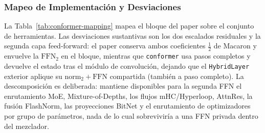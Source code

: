 \subsubsection{Mapeo de Implementación y Desviaciones}

La Tabla~\ref{tab:conformer-mapping} mapea el bloque del paper sobre el conjunto de herramientas. Las desviaciones sustantivas son los dos escalados residuales y la segunda capa feed-forward: el paper conserva ambos coeficientes $\tfrac12$ de Macaron y envuelve la $\mathrm{FFN}_2$ en el bloque, mientras que \texttt{conformer} usa pasos completos y devuelve el estado tras el módulo de convolución, dejando que el \texttt{HybridLayer} exterior aplique su $\mathrm{norm}_2 + \mathrm{FFN}$ compartida (también a paso completo). La descomposición es deliberada: mantiene disponibles para la segunda FFN el enrutamiento MoE, Mixture-of-Depths, los flujos mHC/Hyperloop, AttnRes, la fusión FlashNorm, las proyecciones BitNet y el enrutamiento de optimizadores por grupo de parámetros, nada de lo cual sobreviviría a una FFN privada dentro del mezclador.

